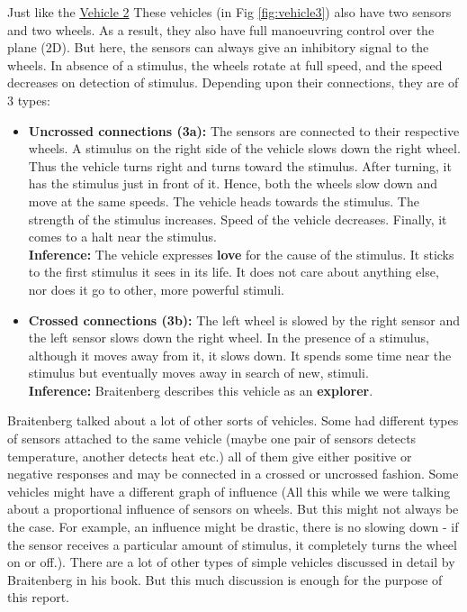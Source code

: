     Just like the \hyperref[sec:Vehicle_2]{Vehicle 2} These vehicles (in Fig \ref{fig:vehicle3}) also have two sensors and two wheels. As a result, they also have full manoeuvring control over the plane (2D). But here, the sensors can always give an inhibitory signal to the wheels. In absence of a stimulus, the wheels rotate at full speed, and the speed decreases on detection of stimulus. Depending upon their connections, they are of 3 types:

    \begin{itemize}
        \item \textbf{Uncrossed connections (3a):} The sensors are connected to their respective wheels. A stimulus on the right side of the vehicle slows down the right wheel. Thus the vehicle turns right and turns toward the stimulus. After turning, it has the stimulus just in front of it. Hence, both the wheels slow down and move at the same speeds. The vehicle heads towards the stimulus. The strength of the stimulus increases. Speed of the vehicle decreases. Finally, it comes to a halt near the stimulus.\\
        \textbf{Inference:} The vehicle expresses \textbf{love} for the cause of the stimulus. It sticks to the first stimulus it sees in its life. It does not care about anything else, nor does it go to other, more powerful stimuli.
        \item \textbf{Crossed connections (3b):} The left wheel is slowed by the right sensor and the left sensor slows down the right wheel. In the presence of a stimulus, although it moves away from it, it slows down. It spends some time near the stimulus but eventually moves away in search of new, stimuli.\\
        \textbf{Inference:} Braitenberg describes this vehicle as an \textbf{explorer}.
    \end{itemize}

    Braitenberg talked about a lot of other sorts of vehicles. Some had different types of sensors attached to the same vehicle (maybe one pair of sensors detects temperature, another detects heat etc.) all of them give either positive or negative responses and may be connected in a crossed or uncrossed fashion. Some vehicles might have a different graph of influence (All this while we were talking about a proportional influence of sensors on wheels. But this might not always be the case. For example, an influence might be drastic, there is no slowing down - if the sensor receives a particular amount of stimulus, it completely turns the wheel on or off.). There are a lot of other types of simple vehicles discussed in detail by Braitenberg in his book. But this much discussion is enough for the purpose of this report.

